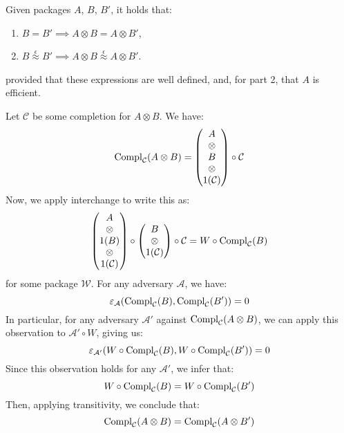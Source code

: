 \begin{lemma}
    Given packages $A$, $B$, $B'$, it holds that:
    \begin{enumerate}
        \item $B = B' \implies A \otimes B = A \otimes B'$,
        \item $B \overset{\epsilon}{\approx} B' \implies A \otimes B \overset{\epsilon}{\approx} A \otimes B'$.
    \end{enumerate}
    provided that these expressions are well defined,
    and, for part 2, that $A$ is efficient.


    Let $\mathcal{C}$ be some completion for $A \otimes B$.
    We have:
    $$
    \text{Compl}_{\mathcal{C}}(A \otimes B)
    =
    \begin{pmatrix}
        A\cr
        \otimes\cr
        B\cr
        \otimes\cr
        1(\mathcal{C})
    \end{pmatrix}
    \circ \mathcal{C}
    $$
    Now, we apply interchange to write this as:
    $$
    \begin{pmatrix}
        A\cr
        \otimes\cr
        1(B)\cr
        \otimes\cr
        1(\mathcal{C})
    \end{pmatrix}
    \circ
    \begin{pmatrix}
        B\cr
        \otimes\cr
        1(\mathcal{C})
    \end{pmatrix}
    \circ \mathcal{C}
    = W \circ \text{Compl}_{\mathcal{C}}(B)
    $$
    for some package $\mathcal{W}$.
    For any adversary $\mathcal{A}$, we have:
    $$
    \varepsilon_{\mathcal{A}}(\text{Compl}_{\mathcal{C}}(B), \text{Compl}_{\mathcal{C}}(B')) = 0
    $$
    In particular, for any adversary $\mathcal{A}'$ against $\text{Compl}_{\mathcal{C}}(A \otimes B)$,
    we can apply this observation to $\mathcal{A}' \circ W$, giving us:
    $$
    \varepsilon_{\mathcal{A}'}(W \circ \text{Compl}_{\mathcal{C}}(B), W \circ \text{Compl}_{\mathcal{C}}(B')) = 0
    $$
    Since this observation holds for any $\mathcal{A}'$, we infer that:
    $$
    W \circ \text{Compl}_{\mathcal{C}}(B) =
    W \circ \text{Compl}_{\mathcal{C}}(B')
    $$
    Then, applying transitivity, we conclude that:
    $$
    \text{Compl}_{\mathcal{C}}(A \otimes B) =
    \text{Compl}_{\mathcal{C}}(A \otimes B')
    $$


\end{lemma}
